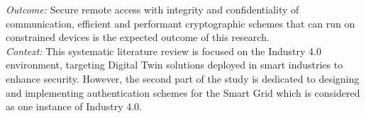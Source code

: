 \textit{Outcome:} Secure remote access with integrity and confidentiality of communication, efficient and performant cryptographic schemes that can run on constrained devices is the expected outcome of this research.\\

\textit{Context:} This systematic literature review is focused on the Industry 4.0 environment, targeting Digital Twin solutions deployed in smart industries to enhance security. However, the second part of the study is dedicated to designing and implementing authentication schemes for the Smart Grid which is considered as one instance of Industry 4.0.